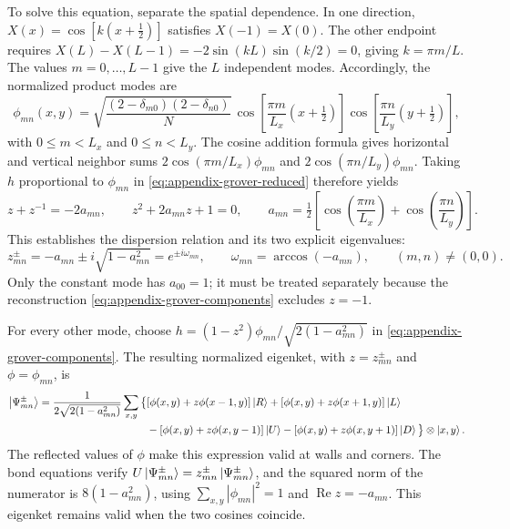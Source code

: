To solve this equation, separate the spatial dependence. In one direction,
$X(x)=\cos[k(x+\tfrac12)]$ satisfies $X(-1)=X(0)$.
The other endpoint requires
$X(L)-X(L-1)=-2\sin(kL)\sin(k/2)=0$, giving $k=\pi m/L$.
The values $m=0,\ldots,L-1$ give the $L$ independent modes.
Accordingly, the normalized product modes are
\begin{equation}
 \phi_{mn}(x,y)=
 \sqrt{\frac{(2-\delta_{m0})(2-\delta_{n0})}{N}}\,
 \cos\!\left[\frac{\pi m}{L_x}\left(x+\tfrac12\right)\right]
 \cos\!\left[\frac{\pi n}{L_y}\left(y+\tfrac12\right)\right],
 \label{eq:appendix-grover-spatial-modes}
\end{equation}
with $0\leq m<L_x$ and $0\leq n<L_y$.
The cosine addition formula gives horizontal and vertical neighbor sums
$2\cos(\pi m/L_x)\phi_{mn}$ and $2\cos(\pi n/L_y)\phi_{mn}$.
Taking $h$ proportional to $\phi_{mn}$ in
\eqref{eq:appendix-grover-reduced} therefore yields
\begin{equation}
 z+z^{-1}=-2a_{mn},\qquad z^2+2a_{mn}z+1=0,\qquad
 a_{mn}=\tfrac12\left[\cos\!\left(\frac{\pi m}{L_x}\right)
                    +\cos\!\left(\frac{\pi n}{L_y}\right)\right].
 \label{eq:appendix-grover-secular}
\end{equation}
This establishes the dispersion relation and its two explicit eigenvalues:
\begin{equation}
 z_{mn}^{\pm}=-a_{mn}\pm i\sqrt{1-a_{mn}^2}
             =e^{\pm i\omega_{mn}},\qquad
 \omega_{mn}=\arccos(-a_{mn}),\qquad (m,n)\neq(0,0).
 \label{eq:appendix-grover-dispersion}
\end{equation}
Only the constant mode has $a_{00}=1$; it must be treated separately because
the reconstruction \eqref{eq:appendix-grover-components} excludes $z=-1$.

For every other mode, choose
$h=(1-z^2)\phi_{mn}/\sqrt{2(1-a_{mn}^2)}$ in
\eqref{eq:appendix-grover-components}. The resulting normalized eigenket,
with $z=z_{mn}^{\pm}$ and $\phi=\phi_{mn}$, is
\begin{align}
 \ket{\Psi_{mn}^{\pm}}
 =\frac{1}{2\sqrt{2(1-a_{mn}^2)}}\sum_{x,y}\big\{&
  [\phi(x,y)+z\phi(x-1,y)]\ket{R}
 +[\phi(x,y)+z\phi(x+1,y)]\ket{L}\notag\\
 &-[\phi(x,y)+z\phi(x,y-1)]\ket{U}
  -[\phi(x,y)+z\phi(x,y+1)]\ket{D}\big\}\otimes\ket{x,y}.
 \label{eq:appendix-grover-eigenvectors}
\end{align}
The reflected values of $\phi$ make this expression valid at walls and
corners. The bond equations verify
$U\ket{\Psi_{mn}^{\pm}}=z_{mn}^{\pm}\ket{\Psi_{mn}^{\pm}}$, and the squared
norm of the numerator is $8(1-a_{mn}^2)$, using
$\sum_{x,y}|\phi_{mn}|^2=1$ and $\operatorname{Re}z=-a_{mn}$.
This eigenket remains valid when the two cosines coincide.

